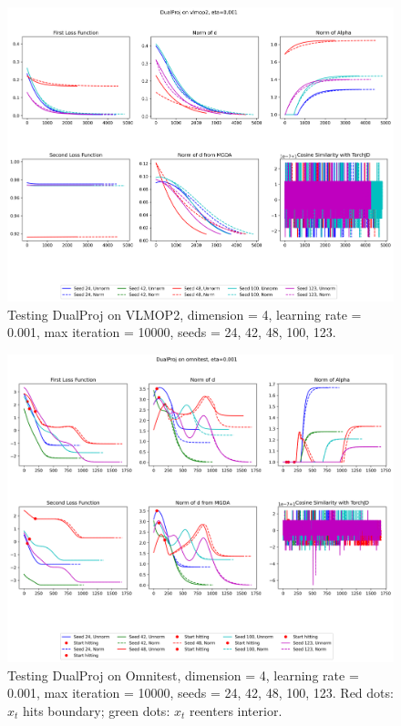 \documentclass{article}
\renewcommand{\|}{\biggr|}
\begin{document}
        \begin{center}
        \begin{figure}[h]
            \includegraphics[scale=0.4]{DualProj_vlmop2.png}
            \caption{Testing DualProj on VLMOP2, dimension = 4, learning rate = 0.001, max iteration = 10000, seeds = 24, 42, 48, 100, 123.}
        \end{figure}
        \begin{figure}[h]
            \includegraphics[scale=0.4]{DualProj_omnitest.png}
            \caption{Testing DualProj on Omnitest, dimension = 4, learning rate = 0.001, max iteration = 10000, seeds = 24, 42, 48, 100, 123. Red dots: $x_t$ hits boundary; green dots: $x_t$ reenters interior.}

\end{figure}
\end{center}
\end{document}
